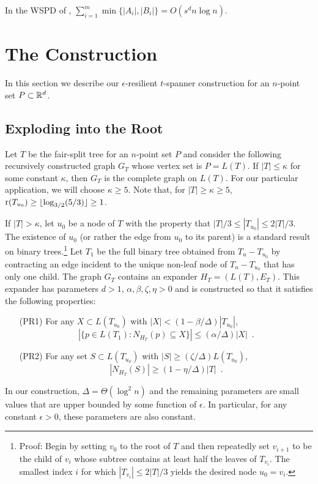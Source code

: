 \documentclass{patmorin}
\DeclareMathOperator{\rank}{r}
\begin{document}
\begin{lem}[Callaghan 1995]
  In the WSPD of ,
   $\sum_{i=1}^m\min\{|A_i|,|B_i|\} = O(s^d n\log n)$.
\end{lem}


\section{The Construction}

In this section we describe our $\epsilon$-resilient $t$-spanner construction for an $n$-point set $P\subset\mathbb{R}^d$.

\subsection{Exploding into the Root}

Let $T$ be the fair-split tree for an $n$-point set $P$ and consider
the following recursively constructed graph $G_{T}$ whose vertex set
is $P=L(T)$.  If $|T| \le \kappa$ for some constant $\kappa$, then $G_T$
is the complete graph on $L(T)$. For our particular application, we will choose $\kappa\ge 5$.  Note that, for $|T|\ge\kappa\ge 5$, $\rank(T_{u_0}) \ge \floor{\log_{3/2}(5/3)} \ge 1$.

If $|T|>\kappa$, let $u_0$ be a node of $T$ with the property that
$|T|/3\le |T_{u_0}|\le 2|T|/3$.  The existence of $u_0$ (or rather
the edge from $u_0$ to its parent) is a standard result on binary
trees.\footnote{Proof: Begin by setting $v_0$ to the root of $T$ and then repeatedly set $v_{i+1}$ to be the child of $v_i$ whose subtree contains at least half the leaves of $T_{v_i}$.  The smallest index $i$ for which $|T_{v_i}|\le 2|T|/3$ yields the desired node $u_0=v_i$.}   Let $T_1$ be the full binary tree obtained from
$T_u-T_{u_0}$ by contracting an edge incident to the unique non-leaf node
of $T_u-T_{u_0}$ that has only one child.  The graph $G_{T}$ contains
an expander $H_T=(L(T),E_T)$. This expander has parameters $d>1$,
$\alpha, \beta,\zeta,\eta > 0$ and is constructed so that it satisfies
the following properties:
\begin{enumerate}
  \item[(PR1)] For any $X\subset L(T_{u_0})$ with
    $|X|<(1-\beta/\Delta)|T_{u_0}|$, 
    \[ |\{p\in L(T_1): N_{H_T}(p)\subseteq X\}|\le (\alpha/\Delta)|X| \enspace . \]

  \item[(PR2)] For any set $S\subset L(T_{u_0})$ with $|S|\ge
    (\zeta/\Delta)L(T_{u_0})$, \[ |N_{H_T}(S)|\ge (1-\eta/\Delta)|T| \enspace .\]
\end{enumerate}
In our construction, $\Delta=\Theta(\log^2 n)$ and the remaining parameters
are small values that are upper bounded by some function of $\epsilon$. In particular, for any constant $\epsilon >0$, these parameters are also constant.
\end{document}
